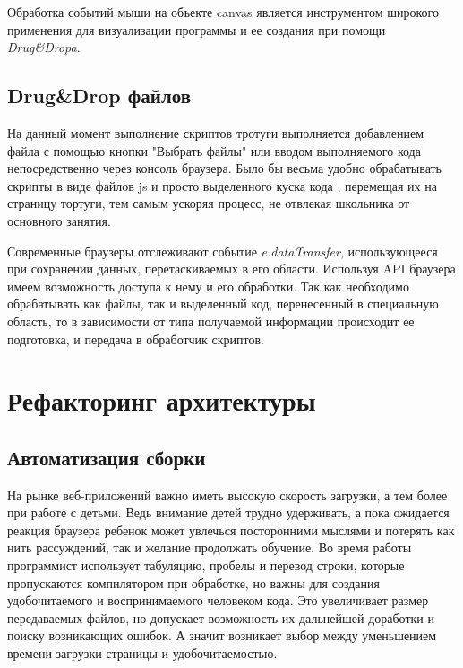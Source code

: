 Обработка событий мыши на объекте canvas является инструментом  широкого применения для визуализации программы и ее создания при помощи \textit{Drug\&Dropa}.



\section{Drug\&Drop файлов} \label{sect1_1}
На данный момент выполнение скриптов тротуги выполняется добавлением файла с помощью кнопки "Выбрать файлы" или вводом выполняемого кода непосредственно через консоль браузера.  Было бы весьма удобно обрабатывать скрипты в виде файлов js и просто выделенного куска кода , перемещая их  на страницу тортуги, тем самым ускоряя процесс, не отвлекая школьника от основного занятия.

Современные браузеры отслеживают событие \textit{e.dataTransfer}, использующееся при сохранении данных, перетаскиваемых в его области. Используя API браузера имеем возможность доступа к нему и его обработки. Так как необходимо обрабатывать как файлы, так и выделенный код, перенесенный в специальную область, то в зависимости от типа получаемой информации  происходит ее подготовка, и передача в обработчик скриптов.

\chapter{Рефакторинг архитектуры} \label{chapt1}


\section{Автоматизация сборки} \label{sect1_1}

На рынке веб-приложений важно иметь высокую скорость загрузки, а тем более при работе с детьми. Ведь внимание детей трудно удерживать, а пока ожидается реакция браузера ребенок может увлечься посторонними мыслями и потерять как нить рассуждений, так и желание продолжать обучение. 
Во время работы программист использует табуляцию, пробелы и перевод строки, которые пропускаются компилятором при обработке, но важны для создания удобочитаемого и воспринимаемого человеком кода. Это увеличивает размер передаваемых файлов, но допускает возможность их дальнейшей доработки и поиску возникающих ошибок. А значит возникает выбор между уменьшением времени загрузки страницы и удобочитаемостью.

